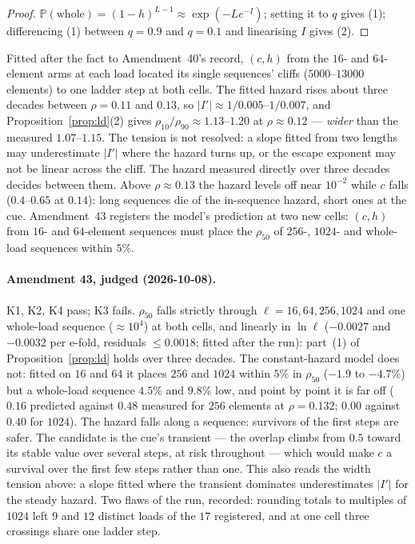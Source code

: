 \documentclass[11pt]{article}
\theoremstyle{definition}
\theoremstyle{plain}
\newcommand{\Prob}{\mathbb{P}}
\begin{document}
\begin{proof}
$\Prob(\text{whole}) = (1-h)^{L-1} \approx \exp(-Le^{-I})$; setting it to $q$
gives (1); differencing (1) between $q=0.9$ and $q=0.1$ and linearising $I$
gives (2).
\end{proof}

Fitted after the fact to Amendment~40's record, $(c,h)$ from the $16$- and
$64$-element arms at each load located its single sequences' cliffs
($5000$--$13000$ elements) to one ladder step at both cells. The fitted hazard
rises about three decades between $\rho = 0.11$ and $0.13$, so $|I'| \approx
1/0.005$--$1/0.007$, and Proposition~\ref{prop:ld}(2) gives $\rho_{10}/\rho_{90}
\approx 1.13$--$1.20$ at $\rho \approx 0.12$ --- \emph{wider} than the measured
$1.07$--$1.15$. The tension is not resolved: a slope fitted from two lengths
may underestimate $|I'|$ where the hazard turns up, or the escape exponent may
not be linear across the cliff. The hazard measured directly over three
decades decides between them. Above $\rho \approx 0.13$ the hazard levels off near $10^{-2}$
while $c$ falls ($0.4$--$0.65$ at $0.14$): long sequences die of the in-sequence
hazard, short ones at the cue. Amendment~43 registers the model's prediction at
two new cells: $(c,h)$ from $16$- and $64$-element sequences must place the
$\rho_{50}$ of $256$-, $1024$- and whole-load sequences within $5\%$.

\paragraph{Amendment 43, judged (2026-10-08).} K1, K2, K4 pass; K3 fails.
$\rho_{50}$ falls strictly through $\ell = 16, 64, 256, 1024$ and one whole-load
sequence ($\approx 10^4$) at both cells, and linearly in $\ln\ell$ ($-0.0027$ and
$-0.0032$ per e-fold, residuals $\le 0.0018$; fitted after the run): part~(1) of
Proposition~\ref{prop:ld} holds over three decades. The constant-hazard model
does not: fitted on $16$ and $64$ it places $256$ and $1024$ within $5\%$ in
$\rho_{50}$ ($-1.9$ to $-4.7\%$) but a whole-load sequence $4.5\%$ and $9.8\%$ low,
and point by point it is far off ($0.16$ predicted against $0.48$ measured for
$256$ elements at $\rho = 0.132$; $0.00$ against $0.40$ for $1024$). The hazard
falls along a sequence: survivors of the first steps are safer. The candidate
is the cue's transient --- the overlap climbs from $0.5$ toward its stable value
over several steps, at risk throughout --- which would make $c$ a survival over
the first few steps rather than one. This also reads the width tension above:
a slope fitted where the transient dominates underestimates $|I'|$ for the
steady hazard. Two flaws of the run, recorded: rounding totals to multiples of
$1024$ left $9$ and $12$ distinct loads of the $17$ registered, and at one cell
three crossings share one ladder step.
\end{document}
